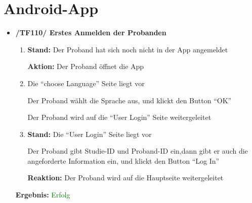 \documentclass[a4paper]{scrreprt}
\begin{document}
	
	      \section{Android-App}
              \begin{itemize}
                  \item \textbf{/TF110/ Erstes Anmelden der Probanden}
                  \begin{enumerate}
                        \item \par \textbf{Stand: }Der Proband hat sich noch nicht in der App angemeldet
                        \par \textbf{Aktion: }Der Proband öffnet die App
                        \par {}

                        \par \textbf{{\color{blue}{Reaktion: }}} {\color{blue}{Die App wechselt auf die ``choose Language'' Seite}}
                        \item \par \textbf{{\color{blue}{Stand: }}}{\color{blue} Die ``choose Language'' Seite liegt vor}
                        \par \textbf{{\color{blue}{Aktion: }}}{\color{blue}Der Proband wählt die Sprache aus, und klickt den Button ``OK''}
                        \par \textbf{{\color{blue}{Reaktion: }}}{\color{blue}Der Proband wird auf die ``User Login'' Seite weitergeleitet}
                        \item \par \textbf{Stand: }Die ``User Login'' Seite liegt vor
                        \par {}
                        \par \textbf{{\color{blue}{Aktion: }}}{\color{blue}Der Proband gibt Studie-ID und Proband-ID ein,dann gibt er auch die angeforderte Information ein, und klickt den Button ``Log In''}
                        \par \textbf{Reaktion: }Der Proband wird auf die Hauptseite weitergeleitet
                  \end{enumerate}
                  
                               \vspace*{0.3cm}
		      		           \par \textbf{Ergebnis: }\textcolor{green}{Erfolg}
		      		           \vspace*{0.6cm}  


\end{itemize}
\end{document}
